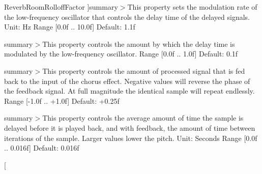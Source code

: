 \begin{Desc}
\begin{description}
{\hypertarget{namespace_open_t_k_1_1_audio_1_1_open_a_l_aa0356299908369b4365d28572c0ec20baedf559ddb71c79f8ba9c69c0b48b25d2}{Reverb\-Room\-Rolloff\-Factor}\label{namespace_open_t_k_1_1_audio_1_1_open_a_l_aa0356299908369b4365d28572c0ec20baedf559ddb71c79f8ba9c69c0b48b25d2}
}]summary$>$This property sets the modulation rate of the low-\/frequency oscillator that controls the delay time of the delayed signals. Unit\-: Hz Range \mbox{[}0.\-0f .. 10.\-0f\mbox{]} Default\-: 1.\-1f\item[{\em 
\hypertarget{namespace_open_t_k_1_1_audio_1_1_open_a_l_aa0356299908369b4365d28572c0ec20ba75ec82a415e49b892993e6669ae5e676}{Chorus\-Rate}\label{namespace_open_t_k_1_1_audio_1_1_open_a_l_aa0356299908369b4365d28572c0ec20ba75ec82a415e49b892993e6669ae5e676}
}]summary$>$This property controls the amount by which the delay time is modulated by the low-\/frequency oscillator. Range \mbox{[}0.\-0f .. 1.\-0f\mbox{]} Default\-: 0.\-1f\item[{\em 
\hypertarget{namespace_open_t_k_1_1_audio_1_1_open_a_l_aa0356299908369b4365d28572c0ec20ba38afbe5603d663f25e16198479f37384}{Chorus\-Depth}\label{namespace_open_t_k_1_1_audio_1_1_open_a_l_aa0356299908369b4365d28572c0ec20ba38afbe5603d663f25e16198479f37384}
}]summary$>$This property controls the amount of processed signal that is fed back to the input of the chorus effect. Negative values will reverse the phase of the feedback signal. At full magnitude the identical sample will repeat endlessly. Range \mbox{[}-\/1.\-0f .. +1.0f\mbox{]} Default\-: +0.25f\item[{\em 
\hypertarget{namespace_open_t_k_1_1_audio_1_1_open_a_l_aa0356299908369b4365d28572c0ec20ba94ede4166f8a23d6066b3304e8697b44}{Chorus\-Feedback}\label{namespace_open_t_k_1_1_audio_1_1_open_a_l_aa0356299908369b4365d28572c0ec20ba94ede4166f8a23d6066b3304e8697b44}
}]summary$>$This property controls the average amount of time the sample is delayed before it is played back, and with feedback, the amount of time between iterations of the sample. Larger values lower the pitch. Unit\-: Seconds Range \mbox{[}0.\-0f .. 0.\-016f\mbox{]} Default\-: 0.\-016f\item[{\em 
}
\end{description}
\end{Desc}
